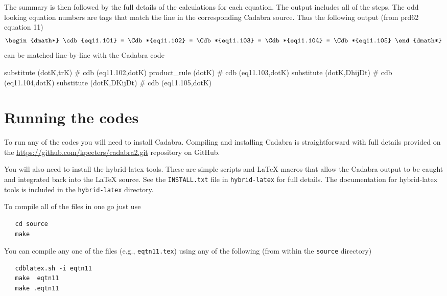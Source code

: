 \documentclass[12pt]{cdblatex}
\begin{document}
The summary is then followed by the full details of the calculations for each
equation. The output includes all of the steps. The odd looking equation numbers are
tags that match the line in the corresponding Cadabra source. Thus the following
output (from prd62 equation 11)
%
\begin{dgroup*}[spread=5pt]
   \begin{dmath*}
      \cdb{eq11.101}
         = \Cdb*{eq11.102}
         = \Cdb*{eq11.103}
         = \Cdb*{eq11.104}
         = \Cdb*{eq11.105}
   \end{dmath*}
\end{dgroup*}
%
can be matched line-by-line with the Cadabra code
%
\begin{cadabra}[numbers=none]
   substitute     (dotK,trK)           # cdb (eq11.102,dotK)
   product_rule   (dotK)               # cdb (eq11.103,dotK)
   substitute     (dotK,DhijDt)        # cdb (eq11.104,dotK)
   substitute     (dotK,DKijDt)        # cdb (eq11.105,dotK)
\end{cadabra}

\clearpage

\section*{Running the codes}

To run any of the codes you will need to install Cadabra. Compiling and installing
Cadabra is straightforward with full details provided on the
\url{https://github.com/kpeeters/cadabra2.git} repository on GitHub.

You will also need to install the hybrid-latex tools. These are simple scripts and
LaTeX macros that allow the Cadabra output to be caught and integrated back into the
LaTeX source. See the {\tt INSTALL.txt} file in {\tt hybrid-latex} for full details.
The documentation for hybrid-latex tools is included in the {\tt hybrid-latex}
directory.

To compile all of the files in one go just use
\lstset{numbers=none}
\begin{lstlisting}
   cd source
   make
\end{lstlisting}

You can compile any one of the files (e.g., {\tt eqtn11.tex}) using any of the
following (from within the {\tt source} directory)

\lstset{numbers=none}
\begin{lstlisting}
   cdblatex.sh -i eqtn11
   make  eqtn11
   make .eqtn11
\end{lstlisting}
\end{document}
